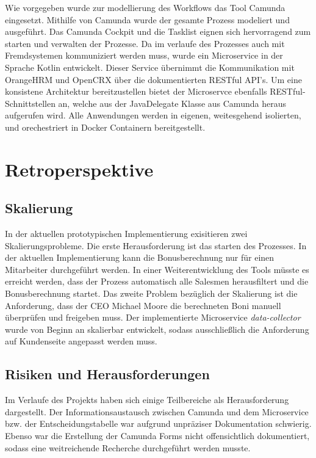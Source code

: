 \documentclass[]{article}
\begin{document}
Wie vorgegeben wurde zur modellierung des Workflows das Tool Camunda eingesetzt. Mithilfe von Camunda wurde der gesamte Prozess modeliert und ausgeführt. Das Camunda Cockpit und die Tasklist eignen sich hervorragend zum starten und verwalten der Prozesse. 
Da im verlaufe des Prozesses auch mit Fremdsystemen kommuniziert werden muss, wurde ein Microservice in der Sprache Kotlin entwickelt. Dieser Service übernimmt die Kommunikation mit OrangeHRM und OpenCRX über die dokumentierten RESTful API's.
Um eine konsistene Architektur bereitzustellen bietet der Microservce ebenfalls RESTful-Schnittstellen an, welche aus der JavaDelegate Klasse aus Camunda heraus aufgerufen wird. 
Alle Anwendungen werden in eigenen, weitesgehend isolierten, und orechestriert in Docker Containern bereitgestellt.


\hypertarget{section-technical-risks}{%
\section{Retroperspektive}\label{section-technical-risks}}
\subsection{Skalierung}
In der aktuellen prototypischen Implementierung exisitieren zwei Skalierungsprobleme. Die erste Herausforderung ist das starten des Prozesses. In der aktuellen Implementierung kann die Bonusberechnung nur für einen Mitarbeiter durchgeführt werden. In einer Weiterentwicklung des Tools müsste es erreicht werden, dass der Prozess automatisch alle Salesmen herausfiltert und die Bonusberechnung startet. 
Das zweite Problem bezüglich der Skalierung ist die Anforderung, dass der CEO Michael Moore die berechneten Boni manuell überprüfen und freigeben muss. 
Der implementierte Microservice \emph{data-collector} wurde von Beginn an skalierbar entwickelt, sodass ausschließlich die Anforderung auf Kundenseite angepasst werden muss.

\subsection{Risiken und Herausforderungen}
Im Verlaufe des Projekts haben sich einige Teilbereiche als Herausforderung dargestellt. Der Informationsaustausch zwischen Camunda und dem Microservice bzw. der Entscheidungstabelle war aufgrund unpräziser Dokumentation schwierig. Ebenso war die Erstellung der Camunda Forms nicht offensichtlich dokumentiert, sodass eine weitreichende Recherche durchgeführt werden musste.
\end{document}
